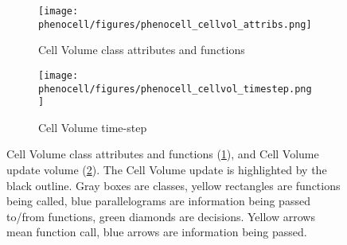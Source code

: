 \begin{figure}[!htpb]
    \centering
    \begin{subfigure}{.9\textwidth}
        \texttt{[image: phenocell/figures/phenocell\_cellvol\_attribs.png]}
        \caption{Cell Volume class attributes and functions}\label{fig:schematics-cellvolume:attr-ops}
    \end{subfigure}
    \begin{subfigure}{.8\textwidth}
        \texttt{[image: phenocell/figures/phenocell\_cellvol\_timestep.png]}
        \caption{Cell Volume time-step}\label{fig:schematics-cellvolume:time}
    \end{subfigure}
    \caption{Cell Volume class attributes and functions (\ref{fig:schematics-cellvolume:attr-ops}), and Cell Volume update volume (\ref{fig:schematics-cellvolume:time}). The Cell Volume update is highlighted by the black outline. Gray boxes are \pcps classes, yellow rectangles are functions being called, blue parallelograms are information being passed to/from functions, green diamonds are decisions. Yellow arrows mean function call, blue arrows are information being passed.}
    \label{fig:schematics-cellvolume}
\end{figure}

